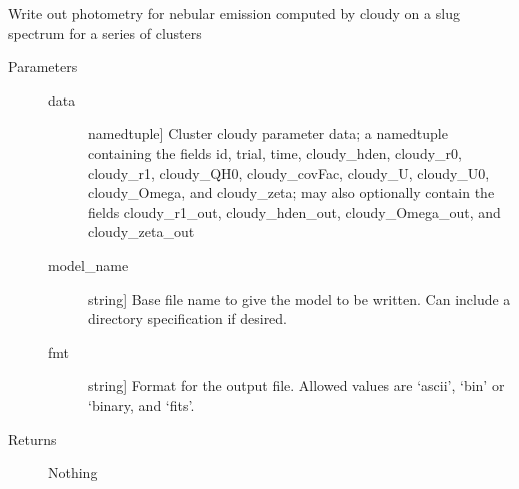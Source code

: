 \documentclass[letterpaper,10pt,english]{sphinxmanual}
\begin{document}
\begin{fulllineitems}
\label{cloudy:slugpy.cloudy.write_cluster_cloudyparams}
Write out photometry for nebular emission computed by cloudy on a
slug spectrum for a series of clusters
\begin{description}
\item[{Parameters}] \leavevmode\begin{description}
\item[{data}] \leavevmode{[}namedtuple{]}
Cluster cloudy parameter data; a namedtuple containing the
fields id, trial, time, cloudy\_hden, cloudy\_r0, 
cloudy\_r1, cloudy\_QH0, cloudy\_covFac, cloudy\_U, cloudy\_U0,
cloudy\_Omega, and cloudy\_zeta; may also optionally contain
the fields cloudy\_r1\_out, cloudy\_hden\_out, cloudy\_Omega\_out,
and cloudy\_zeta\_out

\item[{model\_name}] \leavevmode{[}string{]}
Base file name to give the model to be written. Can include a
directory specification if desired.

\item[{fmt}] \leavevmode{[}string{]}
Format for the output file. Allowed values are `ascii', `bin'
or `binary, and `fits'.

\end{description}

\item[{Returns}] \leavevmode
Nothing

\end{description}

\end{fulllineitems}

\end{document}

